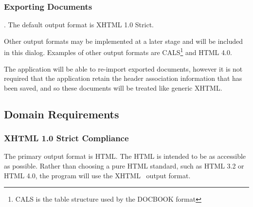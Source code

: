 \subsubsection{Exporting Documents}

. The default
output format is XHTML 1.0 Strict. 

Other output formats may be implemented at a later stage and will be included
in this dialog. Examples of other output formats are CALS\footnote{CALS is the
table structure used by the DOCBOOK format} and HTML 4.0.

The application will be able to re-import exported documents, however it is not
required that the application retain the header association information that
has been saved, and so these documents will be treated like generic XHTML.



\subsection{Domain Requirements}

\subsubsection{XHTML 1.0 Strict Compliance}

The primary output format is HTML. The HTML is intended to be as accessible as
possible. Rather than choosing a pure HTML standard, such as HTML 3.2 or HTML
4.0, the program will use the XHTML~\cite{w3c:xhtml} output format. 

